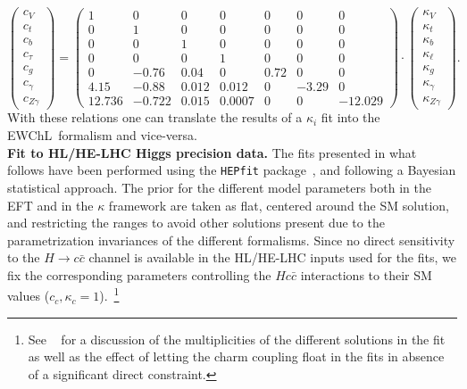 \begin{equation}
  \label{eq:kappa.EFT.7}
  \begin{pmatrix}
    c_{V}\\
    c_{t}\\
    c_{b}\\
    c_{\tau}\\
    c_{g}\\
    c_{\gamma}\\
    c_{Z\gamma}
  \end{pmatrix}
  = 
  \begin{pmatrix}
    1 & 0 & 0 & 0 & 0 & 0 & 0\\
    0 & 1 & 0 & 0 & 0 & 0 & 0\\
    0 & 0 & 1 & 0 & 0 & 0 & 0\\
    0 & 0 & 0 & 1 & 0 & 0 & 0\\
    0 & -0.76 & 0.04 & 0 & 0.72 & 0 & 0\\
    4.15 & -0.88 & 0.012 & 0.012 & 0 & -3.29 & 0\\
    12.736   & -0.722 & 0.015 & 0.0007 & 0 & 0 & -12.029
  \end{pmatrix}
  \cdot
  \begin{pmatrix}
    \kappa_{V}\\
    \kappa_{t}\\
    \kappa_{b}\\
    \kappa_{\ell}\\
    \kappa_{g}\\
    \kappa_{\gamma}\\
    \kappa_{Z\gamma}
  \end{pmatrix}.
\end{equation}
%
With these relations one can translate the results of a $\kappa_i$ fit into the EWChL~formalism and vice-versa. \\

\noindent
{\bf Fit to HL/HE-LHC Higgs precision data.}
The fits presented in what follows have been performed using the {\tt HEPfit} package~\cite{hepfit,hepfitsite}, and following a Bayesian statistical approach.  
 The prior for the different model parameters both in the EFT and in the $\kappa$ framework are taken as flat, centered around the SM solution, and restricting the ranges to avoid other solutions present due to the parametrization invariances of the different formalisms.
Since no direct sensitivity to the $H\to c\bar{c}$ channel is available in the HL/HE-LHC inputs used for the fits, we fix the corresponding parameters controlling the $Hc\bar c$ interactions to their SM values ($c_c,\kappa_c=1$).~\footnote{See ~\cite{deBlas:2018tjm} for a discussion of the multiplicities of the different solutions in the fit as well as the effect of letting the charm coupling float in the fits in absence of a significant direct constraint.}

